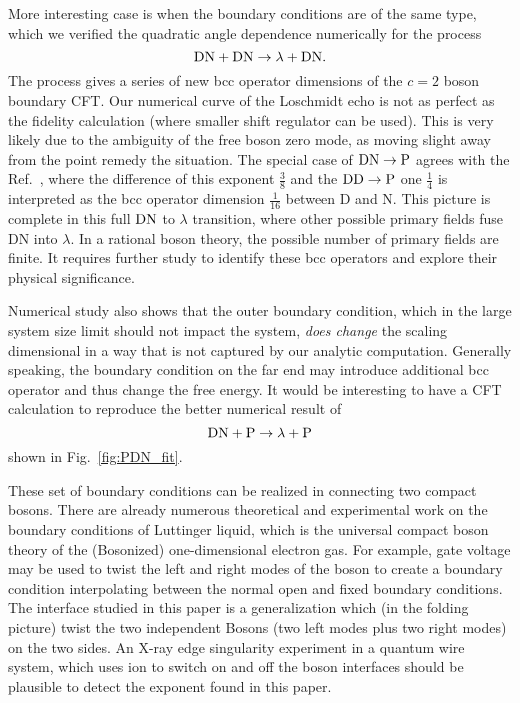 More interesting case is when the boundary conditions are of the same type, which we verified the quadratic angle dependence numerically for the process 
\begin{equation}
{\rm DN} + {\rm DN} \rightarrow \lambda + {\rm DN} . 
\end{equation}
The process gives a series of new bcc operator dimensions of the $c = 2$ boson boundary CFT. Our numerical curve of the Loschmidt echo is not as perfect as the fidelity calculation (where smaller shift regulator can be used). This is very likely due to the ambiguity of the free boson zero mode, as moving slight away from the point remedy the situation. The special case of ${\rm DN} \rightarrow {\rm P}$ agrees with the Ref.~, where the difference of this exponent $\frac{3}{8}$ and the ${\rm DD} \rightarrow {\rm P}$ one $\frac{1}{4}$ is interpreted as the bcc operator dimension $\frac{1}{16}$ between D and N. This picture is complete in this full ${\rm DN}$ to $\lambda $ transition, where other possible primary fields fuse DN into $\lambda$. In a rational boson theory, the possible number of primary fields are finite. It requires further study to identify these bcc operators and explore their physical significance. 


Numerical study also shows that the outer boundary condition, which in the large system size limit should not impact the system, {\it does change} the scaling dimensional in a way that is not captured by our analytic computation. Generally speaking, the boundary condition on the far end may introduce additional bcc operator and thus change the free energy. It would be interesting to have a CFT calculation to reproduce the better numerical result of
\begin{equation}
{\rm DN} + {\rm P} \rightarrow \lambda + {\rm P} 
\end{equation}
shown in Fig.~\ref{fig:PDN_fit}.


These set of boundary conditions can be realized in connecting two compact bosons. There are already numerous theoretical and experimental work on the boundary conditions of Luttinger liquid\cite{schmeltzer_zero_1999,anfuso_luttinger_2003,voit_bounded_2000,fabrizio_interacting_1995,egger_applying_1998}, which is the universal compact boson theory of the (Bosonized) one-dimensional electron gas\cite{giamarchi_quantum_2015}. For example, gate voltage \cite{egger_applying_1998} may be used to twist the left and right modes of the boson to create a boundary condition interpolating between the normal open and fixed boundary conditions. The interface studied in this paper is a generalization which (in the folding picture) twist the two independent Bosons (two left modes plus two right modes) on the two sides. An X-ray edge singularity experiment in a quantum wire system, which uses ion to switch on and off the boson interfaces should be plausible to detect the exponent found in this paper. 


